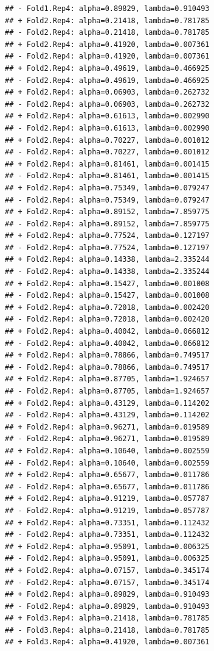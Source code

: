 \documentclass[
]{article}
\begin{document}
\begin{verbatim}
## - Fold1.Rep4: alpha=0.89829, lambda=0.910493 
## + Fold2.Rep4: alpha=0.21418, lambda=0.781785 
## - Fold2.Rep4: alpha=0.21418, lambda=0.781785 
## + Fold2.Rep4: alpha=0.41920, lambda=0.007361 
## - Fold2.Rep4: alpha=0.41920, lambda=0.007361 
## + Fold2.Rep4: alpha=0.49619, lambda=0.466925 
## - Fold2.Rep4: alpha=0.49619, lambda=0.466925 
## + Fold2.Rep4: alpha=0.06903, lambda=0.262732 
## - Fold2.Rep4: alpha=0.06903, lambda=0.262732 
## + Fold2.Rep4: alpha=0.61613, lambda=0.002990 
## - Fold2.Rep4: alpha=0.61613, lambda=0.002990 
## + Fold2.Rep4: alpha=0.70227, lambda=0.001012 
## - Fold2.Rep4: alpha=0.70227, lambda=0.001012 
## + Fold2.Rep4: alpha=0.81461, lambda=0.001415 
## - Fold2.Rep4: alpha=0.81461, lambda=0.001415 
## + Fold2.Rep4: alpha=0.75349, lambda=0.079247 
## - Fold2.Rep4: alpha=0.75349, lambda=0.079247 
## + Fold2.Rep4: alpha=0.89152, lambda=7.859775 
## - Fold2.Rep4: alpha=0.89152, lambda=7.859775 
## + Fold2.Rep4: alpha=0.77524, lambda=0.127197 
## - Fold2.Rep4: alpha=0.77524, lambda=0.127197 
## + Fold2.Rep4: alpha=0.14338, lambda=2.335244 
## - Fold2.Rep4: alpha=0.14338, lambda=2.335244 
## + Fold2.Rep4: alpha=0.15427, lambda=0.001008 
## - Fold2.Rep4: alpha=0.15427, lambda=0.001008 
## + Fold2.Rep4: alpha=0.72018, lambda=0.002420 
## - Fold2.Rep4: alpha=0.72018, lambda=0.002420 
## + Fold2.Rep4: alpha=0.40042, lambda=0.066812 
## - Fold2.Rep4: alpha=0.40042, lambda=0.066812 
## + Fold2.Rep4: alpha=0.78866, lambda=0.749517 
## - Fold2.Rep4: alpha=0.78866, lambda=0.749517 
## + Fold2.Rep4: alpha=0.87705, lambda=1.924657 
## - Fold2.Rep4: alpha=0.87705, lambda=1.924657 
## + Fold2.Rep4: alpha=0.43129, lambda=0.114202 
## - Fold2.Rep4: alpha=0.43129, lambda=0.114202 
## + Fold2.Rep4: alpha=0.96271, lambda=0.019589 
## - Fold2.Rep4: alpha=0.96271, lambda=0.019589 
## + Fold2.Rep4: alpha=0.10640, lambda=0.002559 
## - Fold2.Rep4: alpha=0.10640, lambda=0.002559 
## + Fold2.Rep4: alpha=0.65677, lambda=0.011786 
## - Fold2.Rep4: alpha=0.65677, lambda=0.011786 
## + Fold2.Rep4: alpha=0.91219, lambda=0.057787 
## - Fold2.Rep4: alpha=0.91219, lambda=0.057787 
## + Fold2.Rep4: alpha=0.73351, lambda=0.112432 
## - Fold2.Rep4: alpha=0.73351, lambda=0.112432 
## + Fold2.Rep4: alpha=0.95091, lambda=0.006325 
## - Fold2.Rep4: alpha=0.95091, lambda=0.006325 
## + Fold2.Rep4: alpha=0.07157, lambda=0.345174 
## - Fold2.Rep4: alpha=0.07157, lambda=0.345174 
## + Fold2.Rep4: alpha=0.89829, lambda=0.910493 
## - Fold2.Rep4: alpha=0.89829, lambda=0.910493 
## + Fold3.Rep4: alpha=0.21418, lambda=0.781785 
## - Fold3.Rep4: alpha=0.21418, lambda=0.781785 
## + Fold3.Rep4: alpha=0.41920, lambda=0.007361 

\end{verbatim}
\end{document}
